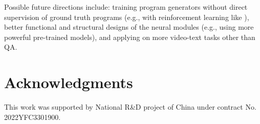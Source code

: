 \documentclass[letterpaper]{article} %
\begin{document}
Possible future directions include: training program generators without direct supervision of ground truth programs (e.g., with reinforcement learning like \cite{Mao2019TheNC}), better functional and structural designs of the neural modules (e.g., using more powerful pre-trained models), and applying on more video-text tasks other than QA.

\section{Acknowledgments}
This work was supported by National R\&D project of China under contract No. 2022YFC3301900.


\end{document}
